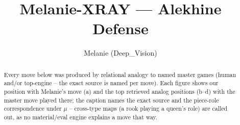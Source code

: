\documentclass[11pt]{article}
\title{Melanie-XRAY — Alekhine Defense}
\author{Melanie (Deep\_Vision)}
\date{}
\begin{document}
\maketitle

\begin{abstract}Every move below was produced by relational analogy to named master games (human and/or top-engine -- the exact source is named per move). Each figure shows our position with Melanie's move (a) and the top retrieved analog positions (b--d) with the master move played there; the caption names the exact source and the piece-role correspondence under $\mu$ -- cross-type maps (a rook playing a queen's role) are called out, as no material/eval engine explains a move that way.\end{abstract}

\begin{figure}[p]\centering
\begin{subfigure}{0.46\textwidth}\centering
\resizebox{\linewidth}{!}{%
\newchessgame
\chessboard[
  setfen={rnbqk2r/ppp1ppbp/1n1p2p1/4P3/3P4/1B3N2/PPP2PPP/RNBQK1R1 b Qkq - 5 7},
  showmover=false,
  pgfstyle=straightmove, color=movearrow, markmove={b8-c6}
]}
\caption{}
\end{subfigure}\hfill
\begin{subfigure}{0.46\textwidth}\centering
\resizebox{\linewidth}{!}{%
\newchessgame
\chessboard[
  setfen={rnbqk2r/pp3ppp/1b3n2/3p4/4p3/1N1P2P1/PP2PPBP/RNBQK2R w KQkq - 3 9},
  showmover=false,
  pgfstyle=straightmove, color=movearrow, markmove={b1-c3}
]}
\caption{}
\end{subfigure}
\\[4pt]
\begin{subfigure}{0.46\textwidth}\centering
\resizebox{\linewidth}{!}{%
\newchessgame
\chessboard[
  setfen={rnbqk2r/pp3ppp/1b3n2/3p4/4p3/1N1P2P1/PP2PPBP/RNBQK2R w KQkq - 3 9},
  showmover=false,
  pgfstyle=straightmove, color=movearrow, markmove={b1-c3}
]}
\caption{}
\end{subfigure}\hfill
\begin{subfigure}{0.46\textwidth}\centering
\resizebox{\linewidth}{!}{%
\newchessgame
\chessboard[
  setfen={r1bqk1nr/ppp2pbp/2np2p1/4p3/4PP2/2NPBN2/PPP3PP/R2QKB1R b KQkq - 5 6},
  showmover=false,
  pgfstyle=straightmove, color=movearrow, markmove={g8-f6}
]}
\caption{}
\end{subfigure}

\end{figure}
\end{document}
